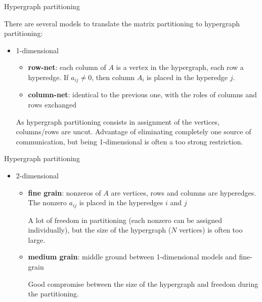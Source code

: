 \begin{frame}{Hypergraph partitioning}

	There are several models to translate the matrix partitioning to hypergraph partitioning:

	\begin{itemize}
		\item 1-dimensional
		\begin{itemize}\itemsep=0.3cm
				\item\textbf{row-net}: each column of $A$ is a vertex in the hypergraph, each row a hyperedge. If $a_{ij} \neq 0$, then column $A_i$ is placed in the hyperedge $j$.
				\item \textbf{column-net}: identical to the previous one, with the roles of columns and rows exchanged
			\end{itemize}
			\vspace{0.5cm}
As hypergraph partitioning consists in assignment of the vertices, columns/rows are uncut. Advantage of eliminating completely one source of communication, but being 1-dimensional is often a too strong restriction.
\end{itemize}
\end{frame}

\begin{frame}{Hypergraph partitioning}
	\begin{itemize}
		\item 2-dimensional
			\begin{itemize}
					\vspace{0.2cm}
				\item \textbf{fine grain}: nonzeros of $A$ are vertices, rows and columns are hyperedges. The nonzero $a_{ij}$ is placed in the hyperedges $i$ and $j$

					\vspace{0.2cm}

				A lot of freedom in partitioning (each nonzero can be assigned individually), but the size of the hypergraph ($N$ vertices) is often too large.

					\vspace{0.2cm}
				\item \textbf{medium grain}: middle ground between 1-dimensional models and fine-grain

					\vspace{0.2cm}

					Good compromise between the size of the hypergraph and freedom during the partitioning.

			\end{itemize}
	\end{itemize}

\end{frame}

